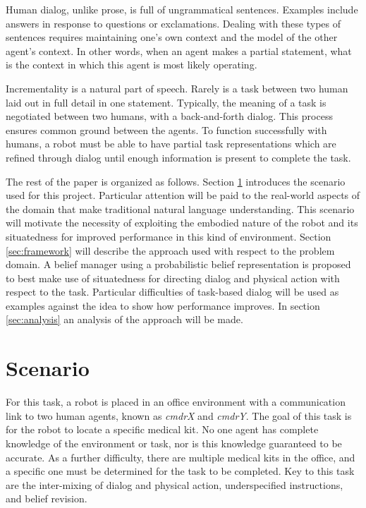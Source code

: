 \documentclass[12pt]{article}
\begin{document}
Human dialog, unlike prose, is full of ungrammatical
sentences. Examples include answers in response to questions or
exclamations. Dealing with these types of sentences requires
maintaining one's own context and the model of the other agent's
context. In other words, when an agent makes a partial statement, what
is the context in which this agent is most likely operating. 

Incrementality is a natural part of speech. Rarely is a task between
two human laid out in full detail in one statement. Typically, the
meaning of a task is negotiated between two humans, with a
back-and-forth dialog. This process ensures common ground between
the agents. To function successfully with humans, a robot must be able
to have partial task representations which are refined through
dialog until enough information is present to complete the task.

The rest of the paper is organized as follows. Section
\ref{sec:scenario} introduces the scenario used for this
project. Particular attention will be paid to the real-world aspects
of the domain that make traditional natural language
understanding. This scenario will motivate the necessity of exploiting
the embodied nature of the robot and its situatedness for improved
performance in this kind of environment. Section \ref{sec:framework}
will describe the approach used with respect to the problem domain. A
belief manager using a probabilistic belief representation is proposed
to best make use of situatedness for directing dialog and physical
action with respect to the task.  Particular difficulties of
task-based dialog will be used as examples against the idea to show
how performance improves. In section \ref{sec:analysis} an analysis of
the approach will be made.

\section{Scenario}
\label{sec:scenario}
For this task, a robot is placed in an office environment with a
communication link to two human agents, known as \textit{cmdrX} and
\textit{cmdrY}. The goal of this task is for the robot to locate a
specific medical kit. No one agent has complete knowledge of the
environment or task, nor is this knowledge guaranteed to be accurate.
As a further difficulty, there are multiple medical kits in the
office, and a specific one must be determined for the task to be
completed. Key to this task are the inter-mixing of dialog and
physical action, underspecified instructions, and belief revision.
\end{document}
